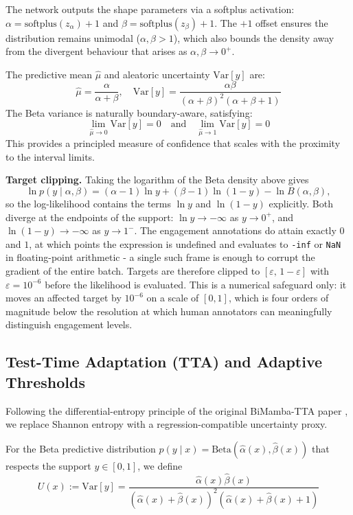\documentclass[11pt,a4paper]{article}
\begin{document}
	The network outputs the shape parameters via a softplus activation: $\alpha = \text{softplus}(z_\alpha) + 1$ and $\beta = \text{softplus}(z_\beta) + 1$. The $+1$ offset ensures the distribution remains unimodal ($\alpha, \beta > 1$), which also bounds the density away from the divergent behaviour that arises as $\alpha, \beta \to 0^+$.
	
	The predictive mean $\hat{\mu}$ and aleatoric uncertainty $\text{Var}[y]$ are:
	$$ \hat{\mu} = \frac{\alpha}{\alpha + \beta}, \quad \text{Var}[y] = \frac{\alpha\beta}{(\alpha+\beta)^2(\alpha+\beta+1)} $$
	The Beta variance is naturally boundary-aware, satisfying: 
	$$ \lim_{\hat{\mu} \to 0} \text{Var}[y] = 0 \quad \text{and} \quad \lim_{\hat{\mu} \to 1} \text{Var}[y] = 0 $$
	This provides a principled measure of confidence that scales with the proximity to the interval limits.
	
	\textbf{Target clipping.} Taking the logarithm of the Beta density above gives $$\ln p(y \mid \alpha,\beta) = (\alpha-1)\ln y + (\beta-1)\ln(1-y) - \ln B(\alpha,\beta),$$ so the log-likelihood contains the terms $\ln y$ and $\ln(1-y)$ explicitly. Both diverge at the endpoints of the support: $\ln y \to -\infty$ as $y \to 0^+$, and $\ln(1-y) \to -\infty$ as $y \to 1^-$. The engagement annotations do attain exactly $0$ and $1$, at which points the expression is undefined and evaluates to \texttt{-inf} or \texttt{NaN} in floating-point arithmetic - a single such frame is enough to corrupt the gradient of the entire batch. Targets are therefore clipped to $[\varepsilon,\, 1-\varepsilon]$ with $\varepsilon = 10^{-6}$ before the likelihood is evaluated. This is a numerical safeguard only: it moves an affected target by $10^{-6}$ on a scale of $[0,1]$, which is four orders of magnitude below the resolution at which human annotators can meaningfully distinguish engagement levels.

	\subsection{Test-Time Adaptation (TTA) and Adaptive Thresholds}
	
	Following the differential-entropy principle of the original BiMamba-TTA paper \cite{ziyu2025}, we replace Shannon entropy with a regression-compatible uncertainty proxy.
	
	For the Beta predictive distribution $p(y \mid x) = \mathrm{Beta}(\hat{\alpha}(x),\hat{\beta}(x))$ that respects the support $y \in [0,1]$, we define $$ U(x) := \mathrm{Var}[y] = \frac{\hat{\alpha}(x)\hat{\beta}(x)}{(\hat{\alpha}(x)+\hat{\beta}(x))^2(\hat{\alpha}(x)+\hat{\beta}(x)+1)} $$
    
\end{document}

